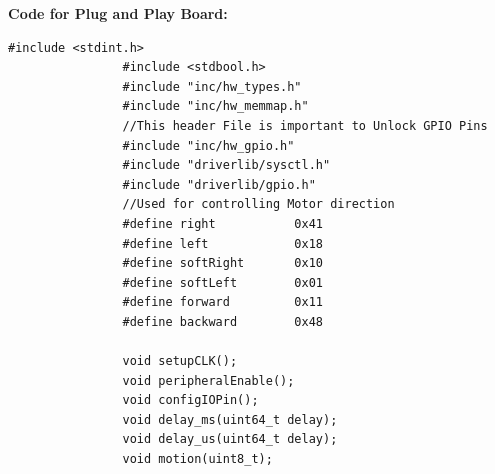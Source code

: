 \documentclass[a4paper,10pt,oneside]{article}
\begin{document}
			\textbf{Code for Plug and Play Board:}
			\begin{lstlisting}[style=CStyle]
				#include <stdint.h>
				#include <stdbool.h>
				#include "inc/hw_types.h"
				#include "inc/hw_memmap.h"
				//This header File is important to Unlock GPIO Pins
				#include "inc/hw_gpio.h"
				#include "driverlib/sysctl.h"
				#include "driverlib/gpio.h"
				//Used for controlling Motor direction
				#define right           0x41
				#define left            0x18
				#define softRight       0x10
				#define softLeft        0x01
				#define forward         0x11
				#define backward        0x48
				
				void setupCLK();
				void peripheralEnable();
				void configIOPin();
				void delay_ms(uint64_t delay);
				void delay_us(uint64_t delay);
				void motion(uint8_t);
				

\end{lstlisting}
\end{document}
